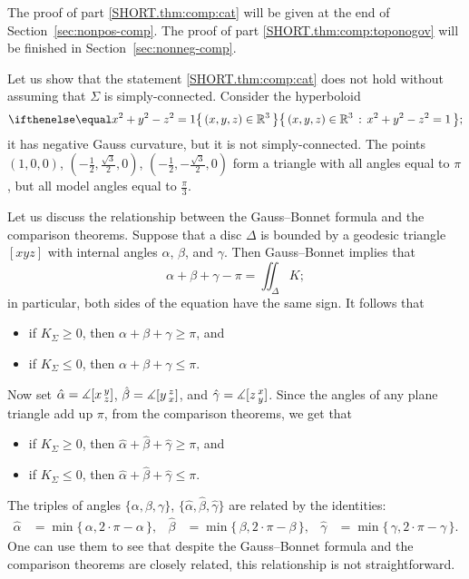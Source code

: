 The proof of part \ref{SHORT.thm:comp:cat} will be given at the end of Section~\ref{sec:nonpos-comp}.
The proof of part \ref{SHORT.thm:comp:toponogov} will be finished in Section~\ref{sec:nonneg-comp}.

Let us show that the statement \ref{SHORT.thm:comp:cat} does not hold without assuming that $\Sigma$ is simply-connected.
Consider the hyperboloid
\[\set{(x,y,z)\in\mathbb{R}^3}{x^2+y^2-z^2=1};\]
it has negative Gauss curvature, but it is not simply-connected.
The points $(1,0,0)$, $(-\tfrac{1}2, \tfrac{\sqrt{3} }2, 0)$, $(-\tfrac{1}2, -\tfrac{\sqrt{3} }2, 0)$
form a triangle with all angles equal to $\pi$, but all model angles equal to $\tfrac{\pi}3$.

Let us discuss the relationship between the Gauss--Bonnet formula and the comparison theorems.
Suppose that a disc $\Delta$ is bounded by a geodesic triangle $[xyz]$ with internal angles $\alpha$, $\beta$, and $\gamma$.
Then Gauss--Bonnet implies that 
\[\alpha+\beta+\gamma-\pi=\iint_\Delta K;\]
in particular, both sides of the equation have the same sign.
It follows that
\begin{itemize}
\item if $K_\Sigma\ge 0$, then $\alpha+\beta+\gamma\ge\pi$, and
\item if $K_\Sigma\le 0$, then $\alpha+\beta+\gamma\le\pi$.
\end{itemize}

Now set 
$\hat\alpha=\measuredangle[x\,{}^{y}_{z}]$,
$\hat\beta=\measuredangle[y\,{}^{z}_{x}]$,
and $\hat\gamma=\measuredangle[z\,{}^{x}_{y}]$.
Since the angles of any plane triangle add up $\pi$, from the comparison theorems, we get that
\begin{itemize}
\item if $K_\Sigma\ge 0$, then $\hat\alpha+\hat\beta+\hat\gamma\ge\pi$, and
\item if $K_\Sigma\le 0$, then $\hat\alpha+\hat\beta+\hat\gamma\le\pi$.
\end{itemize}

The triples of angles $\{ \alpha , \beta , \gamma \}$, $\{ \hat\alpha , \hat\beta , \hat\gamma \}$ are related by the identities:
\begin{align*}
\hat \alpha&=\min\{\,\alpha,2\cdot\pi-\alpha\,\},
&
\hat\beta &=\min\{\,\beta,2\cdot\pi-\beta\,\},
&
\hat\gamma&=\min\{\,\gamma,2\cdot\pi-\gamma\,\}.
\end{align*}
One can use them to see that despite the Gauss--Bonnet formula and the comparison theorems are closely related,
this relationship is not straightforward.


